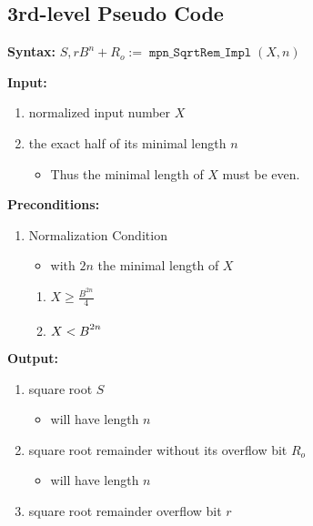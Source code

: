 \documentclass[%
    a4paper,%
]{article}
\makeatletter
\DeclareMathOperator\mpnSqrtRemImpl{\texttt{mpn\_SqrtRem\_Impl}}
\newenvironment*{algo}{%
    \newcommand*\algo@noNextParskip{%
        \vspace{-\parskip}%
    }%
    \newcommand*\algo@section{\textbf}%
    \newcommand*\Syntax{%
        \algo@section{Syntax:} %
    }%
    \newcommand*\Input{%
        \algo@section{Input:}%
        \algo@noNextParskip%
    }%
    \newcommand*\PreConditions{%
        \algo@section{Preconditions:}%
        \algo@noNextParskip%
    }%
    \newcommand*\Output{%
        \algo@section{Output:}%
        \algo@noNextParskip%
    }%
    \newcommand*\PostConditions{%
        \algo@section{Postconditions:}%
        \algo@noNextParskip%
    }%
    \newcommand*\DeducedPostConditions{%
        \algo@section{Deduced Postconditions:}%
        \algo@noNextParskip%
    }%
    \newcommand*\Algorithm{%
        \algo@section{Algorithm:}%
        \algo@noNextParskip%
    }%
}{%
}
\makeatother
\begin{document}
\subsection{3rd-level Pseudo Code}

\begin{algo}
\Syntax $S, rB^n+R_o := \mpnSqrtRemImpl(X, n)$

\Input
\begin{enumerate}
\item normalized input number $X$
\item the exact half of its minimal length $n$
    \begin{itemize}
    \item Thus the minimal length of $X$ must be even.
    \end{itemize}
\end{enumerate}

\PreConditions
\begin{enumerate}
\item Normalization Condition
    \begin{itemize}
    \item with $2n$ the minimal length of $X$
    \end{itemize}
    \begin{enumerate}
    \item $X \ge \frac{B^{2n}}{4}$
    \item $X < B^{2n\strut}$
    \end{enumerate}
\end{enumerate}

\Output
\begin{enumerate}
\item square root $S$
    \begin{itemize}
    \item will have length $n$
    \end{itemize}
\item square root remainder without its overflow bit $R_o$
    \begin{itemize}
    \item will have length $n$
    \end{itemize}
\item square root remainder overflow bit $r$
\end{enumerate}


\end{algo}
\end{document}

